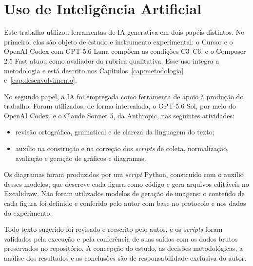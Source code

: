 \chapter{Uso de Inteligência Artificial}\label{cap:uso-ia}

Este trabalho utilizou ferramentas de IA generativa em dois papéis distintos.
No primeiro, elas são objeto de estudo e instrumento experimental: o Cursor e o
OpenAI Codex com GPT-5.6 Luna compõem as condições C3--C6, e o Composer 2.5 Fast
atuou como avaliador da rubrica qualitativa. Esse uso integra a metodologia e
está descrito nos Capítulos~\ref{cap:metodologia} e~\ref{cap:desenvolvimento}.

No segundo papel, a IA foi empregada como ferramenta de apoio à produção do
trabalho. Foram utilizados, de forma intercalada, o GPT-5.6 Sol, por meio do
OpenAI Codex, e o Claude Sonnet 5, da Anthropic, nas
seguintes atividades:

\begin{itemize}
\item revisão ortográfica, gramatical e de clareza da linguagem do texto;
\item auxílio na construção e na correção dos \textit{scripts} de coleta,
normalização, avaliação e geração de gráficos e diagramas.
\end{itemize}

Os diagramas foram produzidos por um \textit{script} Python, construído com o
auxílio desses modelos, que descreve cada figura como código e gera arquivos
editáveis no Excalidraw. Não foram utilizados modelos de geração
de imagens: o conteúdo de cada figura foi definido e conferido pelo autor com
base no protocolo e nos dados do experimento.

Todo texto sugerido foi revisado e reescrito pelo autor, e os \textit{scripts}
foram validados pela execução e pela conferência de suas saídas com os dados
brutos preservados no repositório. A concepção do estudo, as decisões
metodológicas, a análise dos resultados e as conclusões são de
responsabilidade exclusiva do autor.
